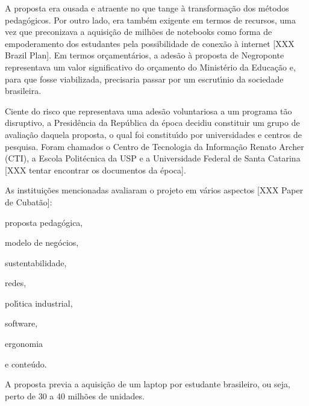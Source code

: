 \documentclass[
12pt,		%
openright,	%
twoside,  %
a4paper,			%
chapter=TITLE,		%
english,			%
french,				%
spanish,			%
brazil				%
]{USPSC-classe/USPSC}
\begin{document}
A proposta era ousada e atraente no que tange \`a transforma\c{c}\~ao dos m\'etodos pedag\'ogicos. Por outro lado, era tamb\'em exigente em termos de recursos, uma vez que preconizava a aquisi\c{c}\~ao de milh\~oes de notebooks como forma de empoderamento dos estudantes pela possibilidade de conex\~ao \`a internet [XXX Brazil Plan]. Em termos or\c{c}ament\'arios, a ades\~ao \`a proposta de Negroponte representava um valor significativo do or\c{c}amento do Minist\'erio da Educa\c{c}\~ao e, para que fosse viabilizada, precisaria passar por um escrut\'{\i}nio da sociedade brasileira.










Ciente do risco que representava uma ades\~ao voluntariosa a um programa t\~ao disruptivo, a Presid\^encia da Rep\'ublica da \'epoca decidiu constituir um grupo de avalia\c{c}\~ao  daquela proposta, o  qual foi constitu\'{\i}do por universidades e centros de pesquisa. Foram chamados o Centro de Tecnologia da Informa\c{c}\~ao Renato Archer (CTI), a Escola Polit\'ecnica da USP e a Universidade Federal de Santa Catarina [XXX tentar encontrar os documentos da \'epoca]. 










As institui\c{c}\~oes mencionadas avaliaram o projeto em v\'arios aspectos [XXX Paper de Cubat\~ao]:











\begin{alineas}
\item proposta pedag\'ogica,
\item modelo de neg\'ocios,
\item sustentabilidade,
\item redes,
\item pol\'{\i}tica industrial,
\item software,
\item ergonomia
\item e conte\'udo.
\end{alineas}

A proposta previa a aquisi\c{c}\~ao de um \textquotedbl laptop por estudante brasileiro, ou seja, perto de 30 a 40 milh\~oes de unidades.
\end{document}
